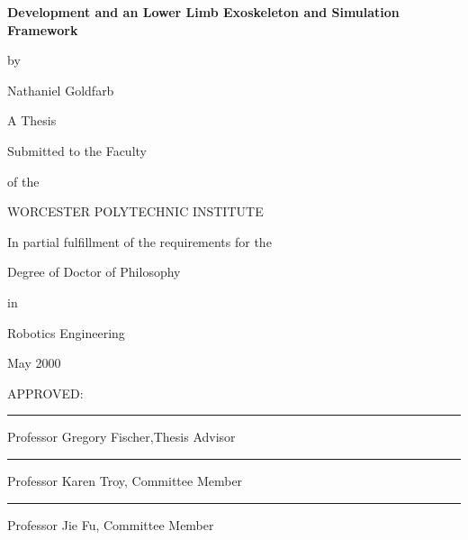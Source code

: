 \documentclass[12pt]{report}
\begin{document}
\newcommand{\brk}{\vspace*{0.18in}}

\thispagestyle{empty}

\begin{center}

\brk


   {\large 
	\textbf{
	Development and an Lower Limb Exoskeleton and Simulation Framework 
	}
   }


\brk
by

\brk
Nathaniel Goldfarb


\brk\brk
A Thesis

\brk
Submitted to the Faculty

\brk
of the 

\brk
WORCESTER POLYTECHNIC INSTITUTE
	
\brk
In partial fulfillment of the requirements for the

\brk
Degree of Doctor of Philosophy

\brk
in

\brk
Robotics Engineering

\brk
May 2000

\end{center}

	
\vfill
APPROVED:

\vspace{0.25in}
\rule{3in}{0.8pt}

Professor Gregory Fischer,Thesis Advisor

\vspace{0.25in}
\rule{3in}{0.8pt}

Professor Karen Troy,  Committee Member


\vspace{0.25in}
\rule{3in}{0.8pt}

Professor Jie Fu,  Committee Member
\end{document}
